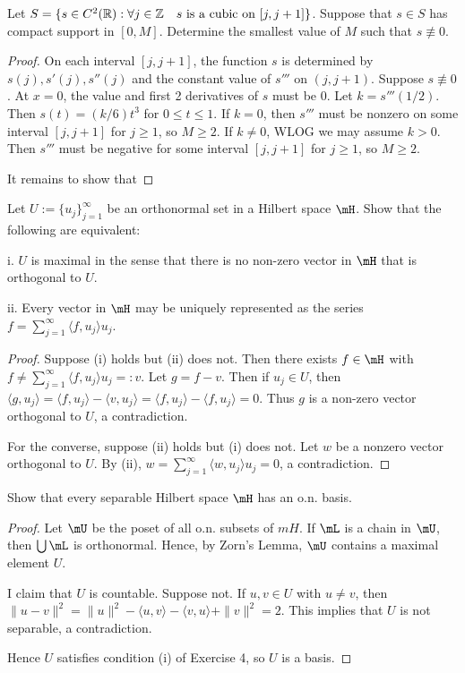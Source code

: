 \documentclass{article}
\begin{document}
 Let $S = \{ s \in C^2(\mathbb{R}) : \forall j \in \mathbb{Z} \quad s \text{ is a cubic on } [j, j+1] \}$.  Suppose that $s \in S$ has compact support in $[0,M]$. Determine the smallest value of $M$ such that $s \not \equiv 0$.

\begin{proof}
On each interval $[j, j+1]$, the function $s$ is determined by $s(j), s'(j), s''(j)$ and the constant value of $s'''$ on $(j, j+1)$. Suppose $s \not \equiv 0$.  At $x = 0$, the value and first 2 derivatives of $s$ must be 0.  Let $k = s'''(1/2)$.  Then $s(t) = (k/6)t^3$ for $0 \le t \le 1$. If $k = 0$, then $s'''$ must be nonzero on some interval $[j,j+1]$ for $j \ge 1$, so $M \ge 2$.  If $k \neq 0$, WLOG we may assume $k > 0$. Then $s'''$ must be negative for some interval $[j, j+1]$ for $j \ge 1$, so $M \ge 2$.

It remains to show that
\end{proof}

 Let $U := \{u_j\}_{j=1}^\infty$ be an orthonormal set in a Hilbert space $\mH$. Show that the following are equivalent:

i. $U$ is maximal in the sense that there is no non-zero vector in $\mH$ that is orthogonal to $U$.

ii. Every vector in $\mH$ may be uniquely represented as the series $f = \sum_{j=1}^\infty \langle f , u_j \rangle u_j$.

\begin{proof}
Suppose (i) holds but (ii) does not.  Then there exists $f \in \mH$ with $f \neq \sum_{j=1}^\infty \langle f , u_j \rangle u_j =: v$.  Let $g = f - v$.  Then if $u_j \in U$, then $\langle g, u_j \rangle = \langle f, u_j \rangle - \langle v, u_j \rangle = \langle f, u_j \rangle - \langle f, u_j \rangle = 0$. Thus $g$ is a non-zero vector orthogonal to $U$, a contradiction.

For the converse, suppose (ii) holds but (i) does not. Let $w$ be a nonzero vector orthogonal to $U$.  By (ii), $w = \sum_{j=1}^\infty \langle w, u_j \rangle u_j = 0$, a contradiction.
\end{proof}

 Show that every separable Hilbert space $\mH$ has an o.n. basis.
\begin{proof}
Let $\mU$ be the poset of all o.n. subsets of $mH$.  If $\mL$ is a chain in $\mU$, then $\bigcup \mL$ is orthonormal.  Hence, by Zorn's Lemma, $\mU$ contains a maximal element $U$. 

I claim that $U$ is countable.  Suppose not. If $u,v \in U$ with $u \neq v$, then $\|u - v\|^2 = \|u\|^2 - \langle u, v \rangle - \langle v, u \rangle + \|v\|^2 = 2$.  This implies that $U$ is not separable, a contradiction.

Hence $U$ satisfies condition (i) of Exercise 4, so $U$ is a basis.
\end{proof}
\end{document}
